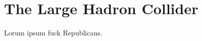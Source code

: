 \documentclass[dissertation.tex]{subfiles}
\begin{document}
\chapter{The Large Hadron Collider}
\label{chap:The Large Hadron Collider}

Lorum ipsum fuck Republicans.
\end{document}
